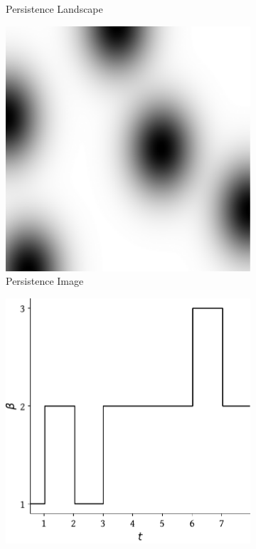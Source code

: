 \begin{figure}[t]
\begin{subfigure}[b]{0.23\textwidth}
        \caption{Persistence Landscape}
    \end{subfigure}\hfill
    \begin{subfigure}[b]{0.23\textwidth}
        \includegraphics[width=\textwidth]{figs/ph/examples/persistence_image_example.pdf}
        \caption{Persistence Image}
    \end{subfigure}\hfill
    \begin{subfigure}[b]{0.23\textwidth}
        \includegraphics[width=\textwidth]{figs/ph/examples/betti_curve_example.pdf}

\end{subfigure}
\end{figure}
